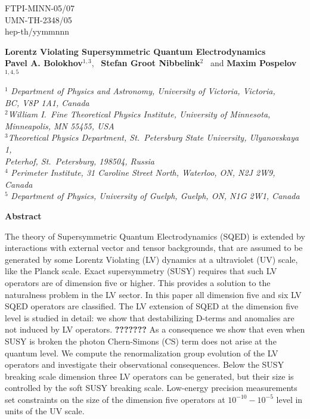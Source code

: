 \documentclass[12pt]{revtex4}
\begin{document}
\begin{titlepage}
\renewcommand{\thefootnote}{\fnsymbol{footnote}}

\begin{flushright}
FTPI-MINN-05/07\\
UMN-TH-2348/05\\
hep-th/yymmnnn
\end{flushright}
\vskip -1cm
\begin{center}
\vspace{0.5cm}

\large {\bf Lorentz Violating Supersymmetric Quantum Electrodynamics}\\[3mm] 
  
\vspace*{0.5cm}
\normalsize
{\bf Pavel A. Bolokhov}$^{1,3}$, ~{\bf Stefan Groot Nibbelink}$^{2}$
\ and
{\bf Maxim Pospelov}$^{1,4,5}$%

\vspace*{0.5cm}
$^{1}$ {\it Department of Physics and Astronomy,
University of Victoria, Victoria,\\ BC, V8P 1A1, Canada}\\
$^{2}${\it William I.\ Fine Theoretical Physics Institute,
University of Minnesota,\\ Minneapolis, MN 55455, USA}\\
$^{3}${\it Theoretical Physics Department, 
St.\ Petersburg State University, Ulyanovskaya 1,\\
Peterhof, St.\ Petersburg, 198504, Russia}\\
$^{4}$ {\it Perimeter Institute, 31 Caroline Street North,
Waterloo, ON,  N2J 2W9,
Canada}\\
$^{5}$ {\it Department of Physics,
 University of Guelph,
 Guelph, ON,  N1G 2W1, Canada}
 \end{center}

\centerline{\large\bf Abstract}

The theory of Supersymmetric Quantum Electrodynamics (SQED) is extended by 
interactions with external vector and tensor backgrounds, that are 
assumed to be generated by some Lorentz Violating (LV) dynamics at a 
ultraviolet (UV) scale, like the Planck scale. Exact supersymmetry
(SUSY) requires that such LV operators are of dimension five or 
higher. This provides a solution to the naturalness problem in the 
LV sector. In this paper all dimension five and six LV SQED operators
are classified. The LV extension of SQED at the dimension five level 
is studied in detail: we show that destabilizing D-terms and anomalies
are not induced by LV operators. 
{\bf ???????}
As a consequence we show
that even when SUSY is broken the photon Chern-Simons (CS) term does not
arise at the quantum level. We compute the renormalization group
evolution of the LV operators and investigate their observational
consequences. Below the SUSY breaking scale dimension three LV
operators can be generated, but their size is controlled by the soft
SUSY breaking scale. Low-energy precision measurements set constraints
on the size of the dimension five operators at $10^{-10}-10^{-5}$
level in units of the UV scale.  





\end{titlepage}
\end{document}
